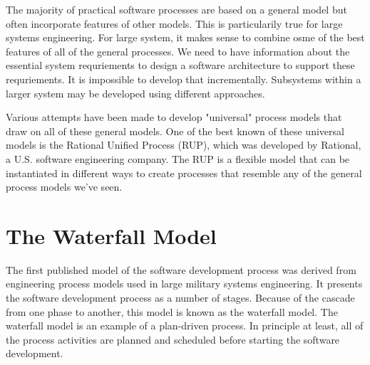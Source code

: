 The majority of practical software processes are based on a general model but often incorporate features of other models. This is particularily true for large systems engineering. For large system, it makes sense to combine osme of the best features of all of the general processes. We need to have information about the essential system requriements to design a software architecture to support these requriements. It is impossible to develop that incrementally. Subsystems within a larger system may be developed using different approaches.

Various attempts have been made to develop "universal" process models that draw on all of these general models. One of the best known of these universal models is the Rational Unified Process (RUP), which was developed by Rational, a U.S. software engineering company. The RUP is a flexible model that can be instantiated in different ways to create processes that resemble any of the general process models we've seen.

\section{The Waterfall Model}
The first published model of the software development process was derived from engineering process models used in large military systems engineering. It presents the software development process as a number of stages. Because of the cascade from one phase to another, this model is known as the waterfall model. The waterfall model is an example of a plan-driven process. In principle at least, all of the process activities are planned and scheduled before starting the software development.

